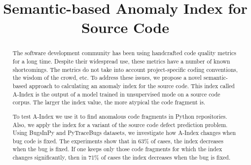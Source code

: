 \documentclass[10pt,conference]{IEEEtran}
\begin{document}
\title{Semantic-based Anomaly Index for \\ Source Code}

\author{\IEEEauthorblockN{
}}
\maketitle

\begin{abstract}
The software development community has been using handcrafted code quality metrics for a long time.
Despite their widespread use, these metrics have a number of known shortcomings.
The metrics do not take into account project-specific coding conventions, the wisdom of the crowd, etc.
To address these issues, we propose a novel semantic-based approach to calculating an anomaly index for the source code.
This index called {\sc A-Index} is the output of a model trained in unsupervised mode on a source code corpus.
The larger the index value, the more atypical the code fragment is.

To test {\sc A-Index} we use it to find anomalous code fragments in Python repositories.
Also, we apply the index for a variant of the source code defect prediction problem.
Using BugsInPy and PyTraceBugs datasets,
we investigate how {\sc A-Index} changes when bug code is fixed.
The experiments show that in 63\% of cases, the index decreases when the bug is fixed.
If one keeps only those code fragments for which the index changes significantly,
 then in 71\% of cases the index decreases when the bug is fixed.
\end{abstract}
\end{document}
